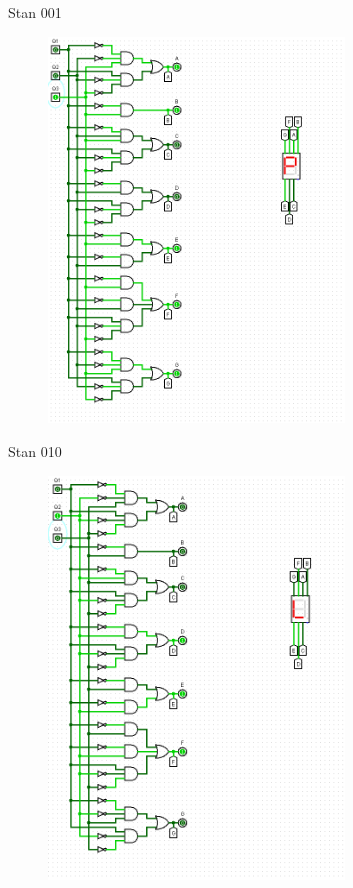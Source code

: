 \documentclass[]{article}
\begin{document}
\newpage
Stan 001	
\begin{figure}[H]
	\centering
	\includegraphics[width=0.7\textwidth]{CZTERY_001.png}
\end{figure}
\newpage
Stan 010
\begin{figure}[H]
	\centering
	\includegraphics[width=0.7\textwidth]{CZTERY_010.png}
\end{figure}
\end{document}

